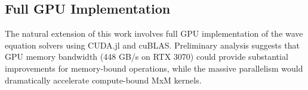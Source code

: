 \subsection*{Full GPU Implementation}

The natural extension of this work involves full GPU implementation of the wave equation solvers using CUDA.jl and cuBLAS. Preliminary analysis suggests that GPU memory bandwidth (448 GB/s on RTX 3070) could provide substantial improvements for memory-bound operations, while the massive parallelism would dramatically accelerate compute-bound MxM kernels.